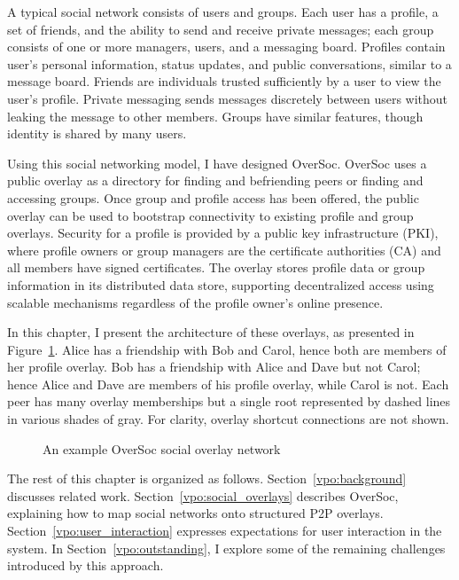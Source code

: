 A typical social network consists of users and groups.  Each user has a
profile, a set of friends, and the ability to send and receive private
messages; each group consists of one or more managers, users, and a messaging
board.  Profiles contain user's personal information, status updates, and
public conversations, similar to a message board.  Friends are individuals
trusted sufficiently by a user to view the user's profile.  Private messaging
sends messages discretely between users without leaking the message to other
members.  Groups have similar features, though identity is shared by many
users.

Using this social networking model, I have designed OverSoc.  OverSoc uses a
public overlay as a directory for finding and befriending peers or finding and
accessing groups.  Once group and profile access has been offered, the public
overlay can be used to bootstrap connectivity to existing profile and group
overlays.  Security for a profile is provided by a public key infrastructure
(PKI), where profile owners or group managers are the certificate authorities
(CA) and all members have signed certificates.  The overlay stores profile data
or group information in its distributed data store, supporting decentralized
access using scalable mechanisms regardless of the profile owner's online
presence.

In this chapter, I present the architecture of these overlays, as presented in
Figure~\ref{fig:spo.system}.  Alice has a friendship with Bob and Carol, hence
both are members of her profile overlay. Bob has a friendship with Alice and
Dave but not Carol; hence Alice and Dave are members of his profile overlay,
while Carol is not.  Each peer has many overlay memberships but a single root
represented by dashed lines in various shades of gray.  For clarity, overlay
shortcut connections are not shown.

\begin{figure}
\centering
{}
\caption{An example OverSoc social overlay network}
\label{fig:spo.system}
\end{figure}

The rest of this chapter is organized as follows.  Section~\ref{vpo:background}
discusses related work.  Section~\ref{vpo:social_overlays} describes OverSoc,
explaining how to map social networks onto structured P2P overlays.
Section~\ref{vpo:user_interaction} expresses expectations for user interaction in
the system.  In Section~\ref{vpo:outstanding}, I explore some of the remaining
challenges introduced by this approach.  

